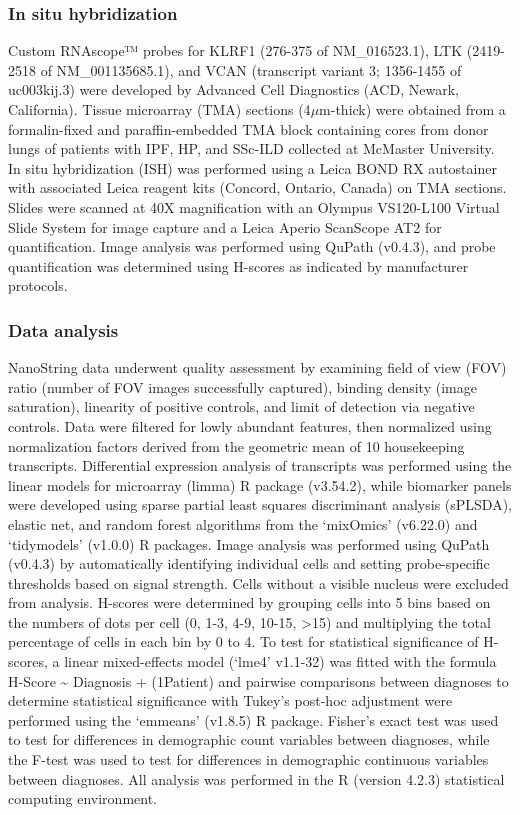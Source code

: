 \documentclass[
]{article}
\begin{document}
\subsubsection{In situ hybridization}\label{in-situ-hybridization}

Custom RNAscope™ probes for KLRF1 (276-375 of NM\_016523.1), LTK (2419-2518 of NM\_001135685.1), and VCAN (transcript variant 3; 1356-1455 of uc003kij.3) were developed by Advanced Cell Diagnostics (ACD, Newark, California). Tissue microarray (TMA) sections (4\(\mu\)m-thick) were obtained from a formalin-fixed and paraffin-embedded TMA block containing cores from donor lungs of patients with IPF, HP, and SSc-ILD collected at McMaster University. In situ hybridization (ISH) was performed using a Leica BOND RX autostainer with associated Leica reagent kits (Concord, Ontario, Canada) on TMA sections. Slides were scanned at 40X magnification with an Olympus VS120-L100 Virtual Slide System for image capture and a Leica Aperio ScanScope AT2 for quantification. Image analysis was performed using QuPath (v0.4.3), and probe quantification was determined using H-scores as indicated by manufacturer protocols.

\subsubsection{Data analysis}\label{data-analysis}

NanoString data underwent quality assessment by examining field of view (FOV) ratio (number of FOV images successfully captured), binding density (image saturation), linearity of positive controls, and limit of detection via negative controls. Data were filtered for lowly abundant features, then normalized using normalization factors derived from the geometric mean of 10 housekeeping transcripts. Differential expression analysis of transcripts was performed using the linear models for microarray (limma) R package (v3.54.2), while biomarker panels were developed using sparse partial least squares discriminant analysis (sPLSDA), elastic net, and random forest algorithms from the `mixOmics' (v6.22.0) and `tidymodels' (v1.0.0) R packages. Image analysis was performed using QuPath (v0.4.3) by automatically identifying individual cells and setting probe-specific thresholds based on signal strength. Cells without a visible nucleus were excluded from analysis. H-scores were determined by grouping cells into 5 bins based on the numbers of dots per cell (0, 1-3, 4-9, 10-15, \textgreater15) and multiplying the total percentage of cells in each bin by 0 to 4. To test for statistical significance of H-scores, a linear mixed-effects model (`lme4' v1.1-32) was fitted with the formula H-Score \textasciitilde{} Diagnosis + (1\textbar Patient) and pairwise comparisons between diagnoses to determine statistical significance with Tukey's post-hoc adjustment were performed using the `emmeans' (v1.8.5) R package. Fisher's exact test was used to test for differences in demographic count variables between diagnoses, while the F-test was used to test for differences in demographic continuous variables between diagnoses. All analysis was performed in the R (version 4.2.3) statistical computing environment.
\end{document}
